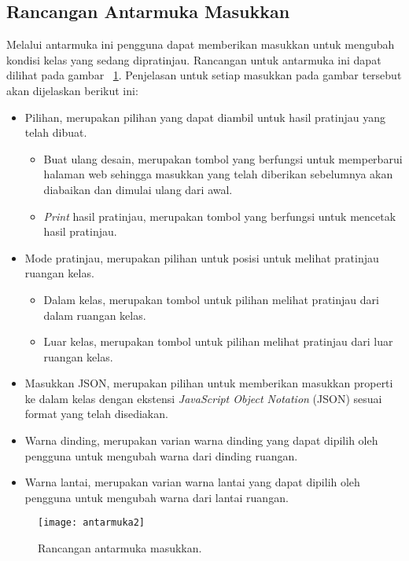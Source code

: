 \subsection{Rancangan Antarmuka Masukkan}
\label{sec:antarmukamasukkan}
Melalui antarmuka ini pengguna dapat memberikan masukkan untuk mengubah kondisi kelas yang sedang dipratinjau. Rancangan untuk antarmuka ini dapat dilihat pada gambar ~\ref{fig:antarmuka2}. Penjelasan untuk setiap masukkan pada gambar tersebut akan dijelaskan berikut ini:
\begin{itemize}
	\item Pilihan, merupakan pilihan yang dapat diambil untuk hasil pratinjau yang telah dibuat.
		\begin{itemize}
			\item Buat ulang desain, merupakan tombol yang berfungsi untuk memperbarui halaman web sehingga masukkan yang telah diberikan sebelumnya akan diabaikan dan dimulai ulang dari awal.
			\item {\it Print} hasil pratinjau, merupakan tombol yang berfungsi untuk mencetak hasil pratinjau.
		\end{itemize}
	\item Mode pratinjau, merupakan pilihan untuk posisi untuk melihat pratinjau ruangan kelas.
		\begin{itemize}
			\item Dalam kelas, merupakan tombol untuk pilihan melihat pratinjau dari dalam ruangan kelas.
			\item Luar kelas, merupakan tombol untuk pilihan melihat pratinjau dari luar ruangan kelas.
		\end{itemize}
	\item Masukkan JSON, merupakan pilihan untuk memberikan masukkan properti ke dalam kelas dengan ekstensi {\it JavaScript Object Notation} (JSON) sesuai format yang telah disediakan.
	\item Warna dinding, merupakan varian warna dinding yang dapat dipilih oleh pengguna untuk mengubah warna dari dinding ruangan.
	\item Warna lantai, merupakan varian warna lantai yang dapat dipilih oleh pengguna untuk mengubah warna dari lantai ruangan.
\end{itemize}
\begin{figure}[ht]
	\centering
	\texttt{[image: antarmuka2]}
	\caption{Rancangan antarmuka masukkan.}
	\label{fig:antarmuka2}
	\vspace{8mm}
\end{figure}

